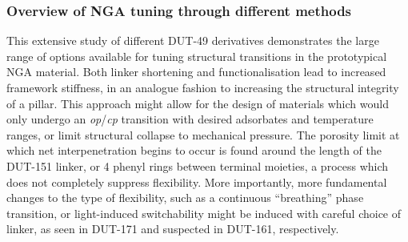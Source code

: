\subsubsection{Overview of NGA tuning through different methods}

This extensive study of different DUT-49 derivatives demonstrates the 
large range of options available for tuning structural 
transitions in the prototypical NGA material. Both linker 
shortening and functionalisation lead to increased framework
stiffness, in an analogue fashion to increasing the 
structural integrity of a pillar. This approach might allow 
for the design of materials which would only undergo an 
\textit{op}/\textit{cp} transition with desired adsorbates and
temperature ranges, or limit structural collapse to mechanical 
pressure. The porosity limit at which net interpenetration begins
to occur is found around the length of the DUT-151 linker, 
or 4 phenyl rings between terminal moieties, a process which does 
not completely suppress flexibility. More importantly, more 
fundamental changes to the type of flexibility, such as 
a continuous ``breathing'' phase transition, or light-induced
switchability might be induced with careful choice of linker,
as seen in DUT-171 and suspected in DUT-161, respectively.
